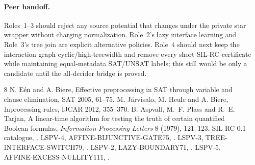 \documentclass[11pt]{article}
\begin{document}
\paragraph{Peer handoff.}
Roles~1--3 should reject any source potential that changes under the private
star wrapper without charging normalization.  Role~2's lazy interface
learning and Role~3's tree join are explicit alternative policies.  Role~4
should next keep the interaction graph cyclic/high-treewidth and remove every
short SIL-RC certificate while maintaining equal-metadata SAT/UNSAT labels;
this still would be only a candidate until the all-decider bridge is proved.

\begin{thebibliography}{8}
 N. E\'en and A. Biere, Effective preprocessing in SAT
through variable and clause elimination, SAT 2005, 61--75.
 M. J\"arvisalo, M. Heule and A. Biere, Inprocessing rules,
IJCAR 2012, 355--370.
 B. Aspvall, M.~F. Plass and R.~E. Tarjan,
A linear-time algorithm for testing the truth of certain quantified Boolean
formulas, \emph{Information Processing Letters} 8 (1979), 121--123.
 SIL-RC 0.1 catalogue,
.
 LSPV-4, AFFINE-BIJUNCTIVE-GATE75,
.
 LSPV-3, TREE-INTERFACE-SWITCH79,
.
 LSPV-2, LAZY-BOUNDARY71,
.
 LSPV-5, AFFINE-EXCESS-NULLITY111,
.
\end{thebibliography}
\end{document}
